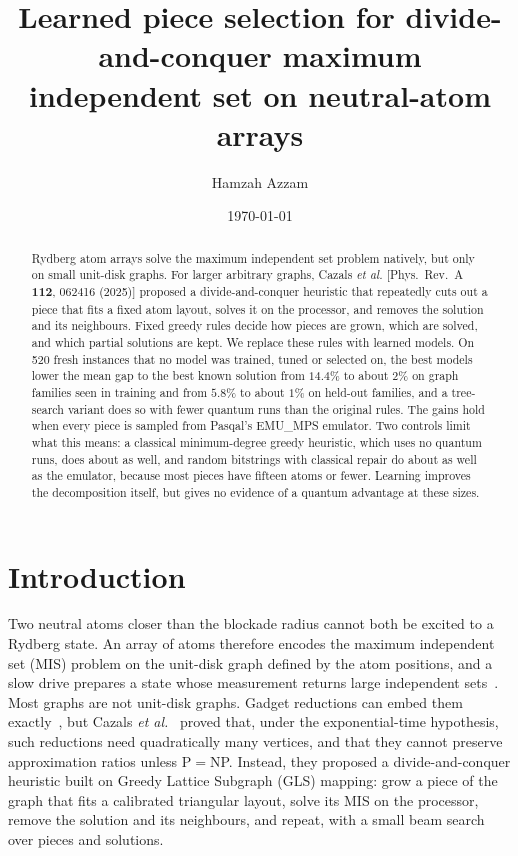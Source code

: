\documentclass[10pt,pra,aps,twocolumn,superscriptaddress,floatfix,nofootinbib]{revtex4-2}
\newcommand{\GLS}{GLS}
\newcommand{\emumps}{EMU\_MPS}
\begin{document}
\title{Learned piece selection for divide-and-conquer maximum independent set on neutral-atom arrays}

\author{Hamzah Azzam}

\date{\today}

\begin{abstract}
Rydberg atom arrays solve the maximum independent set problem natively, but only on small unit-disk graphs. For larger arbitrary graphs, Cazals \textit{et al.} [Phys.\ Rev.\ A \textbf{112}, 062416 (2025)] proposed a divide-and-conquer heuristic that repeatedly cuts out a piece that fits a fixed atom layout, solves it on the processor, and removes the solution and its neighbours. Fixed greedy rules decide how pieces are grown, which are solved, and which partial solutions are kept. We replace these rules with learned models. On 520 fresh instances that no model was trained, tuned or selected on, the best models lower the mean gap to the best known solution from $14.4\%$ to about $2\%$ on graph families seen in training and from $5.8\%$ to about $1\%$ on held-out families, and a tree-search variant does so with fewer quantum runs than the original rules. The gains hold when every piece is sampled from Pasqal's \emumps{} emulator. Two controls limit what this means: a classical minimum-degree greedy heuristic, which uses no quantum runs, does about as well, and random bitstrings with classical repair do about as well as the emulator, because most pieces have fifteen atoms or fewer. Learning improves the decomposition itself, but gives no evidence of a quantum advantage at these sizes.
\end{abstract}

\maketitle

\section{Introduction}

Two neutral atoms closer than the blockade radius cannot both be excited to a Rydberg state. An array of atoms therefore encodes the maximum independent set (MIS) problem on the unit-disk graph defined by the atom positions, and a slow drive prepares a state whose measurement returns large independent sets~\cite{pichler2018quantum,henriet2020quantum,ebadi2022quantum}. Most graphs are not unit-disk graphs. Gadget reductions can embed them exactly~\cite{nguyen2023quantum}, but Cazals \textit{et al.}~\cite{cazals2025gadgets} proved that, under the exponential-time hypothesis, such reductions need quadratically many vertices, and that they cannot preserve approximation ratios unless P${}={}$NP. Instead, they proposed a divide-and-conquer heuristic built on Greedy Lattice Subgraph (\GLS{}) mapping: grow a piece of the graph that fits a calibrated triangular layout, solve its MIS on the processor, remove the solution and its neighbours, and repeat, with a small beam search over pieces and solutions.
\end{document}
